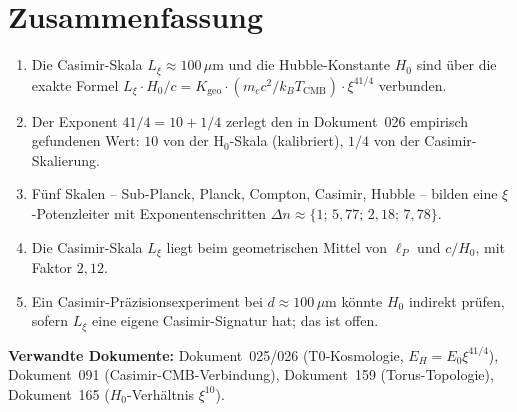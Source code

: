 \section{Zusammenfassung}
\label{sec:zusammenfassung}

\begin{foundation}
    \begin{enumerate}
        \item Die Casimir-Skala $L_\xi \approx 100\,\mu\text{m}$ und die
              Hubble-Konstante $H_0$ sind über die exakte Formel
              $L_\xi \cdot H_0/c = K_\text{geo} \cdot (m_e c^2/k_B T_\text{CMB}) \cdot \xi^{41/4}$
              verbunden.
        \item Der Exponent $41/4 = 10 + 1/4$ zerlegt den in Dokument~026
              empirisch gefundenen Wert: $10$ von der H$_0$-Skala
              (kalibriert), $1/4$ von der Casimir-Skalierung.
        \item Fünf Skalen -- Sub-Planck, Planck, Compton, Casimir, Hubble --
              bilden eine $\xi$-Potenzleiter mit Exponentenschritten
              $\Delta n \approx \{1;\,5{,}77;\,2{,}18;\,7{,}78\}$.
        \item Die Casimir-Skala $L_\xi$ liegt beim geometrischen Mittel
              von $\ell_P$ und $c/H_0$, mit Faktor $2{,}12$.
        \item Ein Casimir-Präzisionsexperiment bei $d \approx 100\,\mu\text{m}$
              könnte $H_0$ indirekt prüfen, sofern $L_\xi$ eine eigene
              Casimir-Signatur hat; das ist offen.
    \end{enumerate}
\end{foundation}

\vspace{1.5em}
\noindent\textbf{Verwandte Dokumente:}
Dokument~025/026 (T0-Kosmologie, $E_H = E_0\xi^{41/4}$),
Dokument~091 (Casimir-CMB-Verbindung),
Dokument~159 (Torus-Topologie),
Dokument~165 ($H_0$-Verhältnis $\xi^{10}$).
